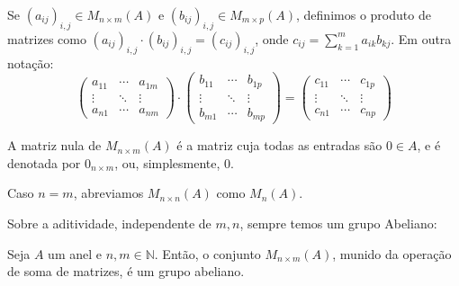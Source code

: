 \begin{definition}
Se $(a_{ij})_{i, j}\in M_{n\times m}(A)$ e $(b_{ij})_{i, j}\in M_{m\times p}(A)$, definimos o produto de matrizes como $(a_{ij})_{i,j}\cdot(b_{ij})_{i,j}=(c_{ij})_{i,j}$, onde $c_{ij}=\sum_{k=1}^m a_{ik}b_{kj}$.
Em outra notação:
\begin{equation*}
    \begin{pmatrix}
        a_{11} & \cdots & a_{1m}\\
        \vdots & \ddots & \vdots\\
        a_{n1} & \cdots & a_{nm}
    \end{pmatrix}
    \cdot
    \begin{pmatrix}
        b_{11} & \cdots & b_{1p}\\
        \vdots & \ddots & \vdots\\
        b_{m1} & \cdots & b_{mp}
    \end{pmatrix}
    =
    \begin{pmatrix}
        c_{11} & \cdots & c_{1p}\\
        \vdots & \ddots & \vdots\\
        c_{n1} & \cdots & c_{np}
    \end{pmatrix}
\end{equation*}

A matriz nula de $M_{n\times m}(A)$ é a matriz cuja todas as entradas são $0\in A$, e é denotada por $0_{n\times m}$, ou, simplesmente, $0$.

Caso $n=m$, abreviamos $M_{n\times n}(A)$ como $M_n(A)$.
\end{definition}

Sobre a aditividade, independente de $m, n$, sempre temos um grupo Abeliano:

\begin{prop}
Seja $A$ um anel e $n, m \in \mathbb{N}$. Então, o conjunto $M_{n \times m}(A)$, munido da operação de soma de matrizes, é um grupo abeliano.
\end{prop}

